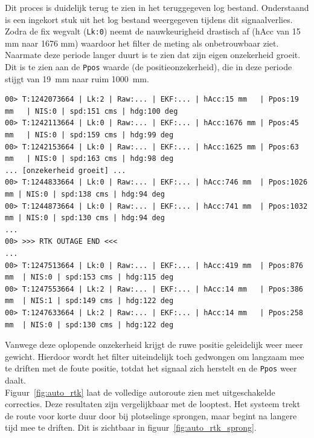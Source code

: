 Dit proces is duidelijk terug te zien in het teruggegeven log bestand. Onderstaand is een ingekort stuk uit het log bestand weergegeven tijdens dit signaalverlies. Zodra de fix wegvalt (\texttt{Lk:0}) neemt de nauwkeurigheid drastisch af (hAcc van 15 mm naar 1676 mm) waardoor het filter de meting als onbetrouwbaar ziet. Naarmate deze periode langer duurt is te zien dat zijn eigen onzekerheid groeit. Dit is te zien aan de \texttt{Ppos} waarde (de positieonzekerheid), die in deze periode stijgt van 19~mm naar ruim 1000~mm.

\begin{lstlisting}[caption={Log-extract dat de oplopende onzekerheid (Ppos) toont tijdens het verlies en herstel van de RTK fix.}, label={lst:log_outage}, basicstyle=\ttfamily\scriptsize, breaklines=true, frame=single]
00> T:1242073664 | Lk:2 | Raw:... | EKF:... | hAcc:15 mm   | Ppos:19 mm   | NIS:0 | spd:151 cms | hdg:100 deg
00> T:1242113664 | Lk:0 | Raw:... | EKF:... | hAcc:1676 mm | Ppos:45 mm   | NIS:0 | spd:159 cms | hdg:99 deg
00> T:1242153664 | Lk:0 | Raw:... | EKF:... | hAcc:1625 mm | Ppos:63 mm   | NIS:0 | spd:163 cms | hdg:98 deg
... [onzekerheid groeit] ...
00> T:1244833664 | Lk:0 | Raw:... | EKF:... | hAcc:746 mm  | Ppos:1026 mm | NIS:0 | spd:138 cms | hdg:94 deg
00> T:1244873664 | Lk:0 | Raw:... | EKF:... | hAcc:741 mm  | Ppos:1032 mm | NIS:0 | spd:130 cms | hdg:94 deg
...
00> >>> RTK OUTAGE END <<<
...
00> T:1247513664 | Lk:0 | Raw:... | EKF:... | hAcc:419 mm  | Ppos:876 mm  | NIS:0 | spd:153 cms | hdg:115 deg
00> T:1247553664 | Lk:2 | Raw:... | EKF:... | hAcc:14 mm   | Ppos:386 mm  | NIS:1 | spd:149 cms | hdg:122 deg
00> T:1247633664 | Lk:2 | Raw:... | EKF:... | hAcc:14 mm   | Ppos:258 mm  | NIS:0 | spd:130 cms | hdg:122 deg
\end{lstlisting}

Vanwege deze oplopende onzekerheid krijgt de ruwe positie geleidelijk weer meer gewicht. Hierdoor wordt het filter uiteindelijk toch gedwongen om langzaam mee te driften met de foute positie, totdat het signaal zich herstelt en de \texttt{Ppos} weer daalt. \\

Figuur~\ref{fig:auto_rtk} laat de volledige autoroute zien met uitgeschakelde correcties. Deze resultaten zijn vergelijkbaar met de looptest. Het systeem trekt de route voor korte duur door bij plotselinge sprongen, maar begint na langere tijd mee te driften. Dit is zichtbaar in figuur~\ref{fig:auto_rtk_sprong}.

\newpage

